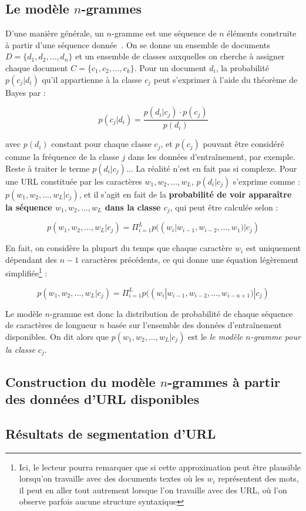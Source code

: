 \documentclass[11pt, a4paper]{article}
\begin{document}
\subsection{Le modèle $n$-grammes}

D'une manière générale, un $n$-gramme est une séquence de $n$ éléments construite à partir d'une séquence donnée~\cite{abdallah}. On se donne un ensemble de documents $D = \{d_1, d_2, \dots, d_n\}$ et un ensemble de classes auxquelles on cherche à assigner chaque document $C = \{c_1, c_2, \dots, c_k\}$. Pour un document $d_i$, la probabilité $p(c_j|d_i)$ qu'il appartienne à la classe $c_j$ peut s'exprimer à l'aide du théorème de Bayes par :

\[
p(c_j|d_i) = \frac{p(d_i|c_j) \cdot p(c_j)}{p(d_i)}
\]

avec $p(d_i)$ constant pour chaque classe $c_j$, et $p(c_j)$ pouvant être considéré comme la fréquence de la classe $j$ dans les données d'entraînement, par exemple. Reste à traiter le terme $p(d_i|c_j)$... La réalité n'est en fait pas si complexe. Pour une URL constituée par les caractères $w_1, w_2, \dots, w_L$, $p(d_i|c_j)$ s'exprime comme : $p(w_1, w_2, \dots, w_L|c_j)$, et il s'agit en fait de la \textbf{probabilité de voir apparaître la séquence $w_1, w_2, \dots, w_L$ dans la classe $c_j$}, qui peut être calculée selon :

\[
p(w_1, w_2, \dots, w_L|c_j) = \Pi_{i=1}^{L}p((w_i|w_{i-1}, w_{i-2}, \dots, w_1)|c_j)
\]

En fait, on considère la plupart du temps que chaque caractère $w_i$ est uniquement dépendant des $n-1$ caractères précédents, ce qui donne une équation légèrement simplifiée\footnote{Ici, le lecteur pourra remarquer que si cette approximation peut être plausible lorsqu'on travaille avec des documents textes où les $w_i$ représentent des mots, il peut en aller tout autrement lorsque l'on travaille avec des URL, où l'on observe parfois aucune structure syntaxique} :

\[
p(w_1, w_2, \dots, w_L|c_j) = \Pi_{i=1}^{L}p((w_i|w_{i-1}, w_{i-2}, \dots, w_{i-n+1})|c_j)
\]

Le modèle $n$-gramme est donc la distribution de probabilité de chaque séquence de caractères de longueur $n$ basée sur l'ensemble des données d'entraînement disponibles. On dit alors que $p(w_1, w_2, \dots, w_L|c_j)$ est le \textit{le modèle $n$-gramme pour la classe $c_j$}.

\subsection{Construction du modèle $n$-grammes à partir des données d'URL disponibles}



\subsection{Résultats de segmentation d'URL}

\newpage
{}


\end{document}
